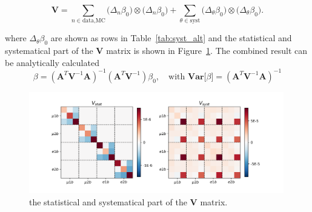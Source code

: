 \begin{equation}
    \textbf{V} =
    \sum_{n \in \text{data,MC}} \big( \Delta_{n}\beta_0 \big) \otimes   \big( \Delta_{n}\beta_0 \big) +
    \sum_{\theta \in \text{syst}} \big( \Delta_{\theta}\beta_0 \big) \otimes  \big( \Delta_{\theta}\beta_0 \big).
\end{equation}

\noindent where $\Delta_{\theta}\beta_0$ are shown as rows in Table~\ref{tab:syst_alt} and the statistical and systematical part
of the $\textbf{V}$ matrix is shown in Figure~\ref{fig:corBetaBar}. The combined result can 
be analytically calculated 
\begin{equation}
    \beta =   (\textbf{A}^T \textbf{V}^{-1} \textbf{A})^{-1}(\textbf{A}^T \textbf{V}^{-1}) \beta_0 , \quad
    \text{with } \textbf{Var}\big[\beta\big]  =   (\textbf{A}^T \textbf{V}^{-1} \textbf{A})^{-1}
\end{equation}

\begin{figure}[ht]
    \centering
    \includegraphics[width=0.99\textwidth]{chapters/Analysis/sectionSystematics/figures/covarMatrix_total.png}
    \caption{ the statistical and systematical part of the $\textbf{V}$ matrix. }
    \label{fig:corBetaBar}
\end{figure}



